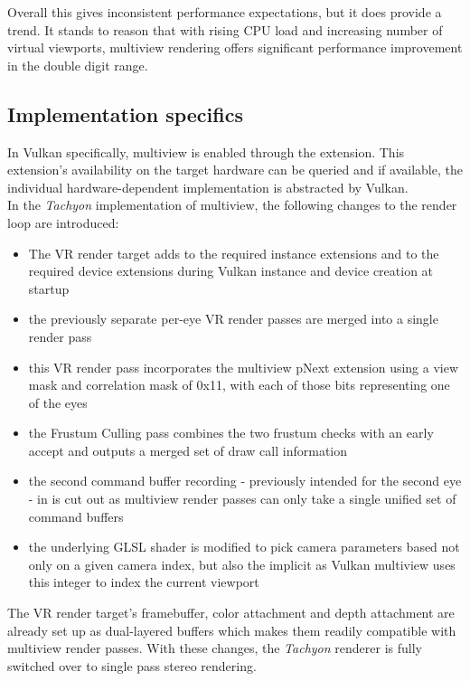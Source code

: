 Overall this gives inconsistent performance expectations, but it does provide a trend. It stands to reason that with rising CPU load and increasing number of virtual viewports, multiview rendering offers significant performance improvement in the double digit range. 

\subsection{Implementation specifics}
In Vulkan specifically, multiview is enabled through the  extension. This extension's availability on the target hardware can be queried and if available, the individual hardware-dependent implementation is abstracted by Vulkan. \\
In the \textit{\gls{Tachyon}} implementation of multiview, the following changes to the render loop are introduced: 
\begin{itemize}
\item The VR render target adds  to the required instance extensions and  to the required device extensions during Vulkan instance and device creation at startup
\item the previously separate per-eye VR render passes are merged into a single render pass
\item this VR render pass incorporates the multiview pNext extension using a view mask and correlation mask of 0x11, with each of those bits representing one of the eyes
\item the Frustum Culling pass combines the two frustum checks with an early accept and outputs a merged set of draw call information
\item the second command buffer recording - previously intended for the second eye - in  is cut out as multiview render passes can only take a single unified set of command buffers
\item the underlying GLSL shader is modified to pick camera parameters based not only on a given camera index, but also the implicit  as Vulkan multiview uses this integer to index the current viewport
\end{itemize}
The VR render target's framebuffer, color attachment and depth attachment are already set up as dual-layered buffers which makes them readily compatible with multiview render passes. With these changes, the \textit{\gls{Tachyon}} renderer is fully switched over to single pass stereo rendering. 